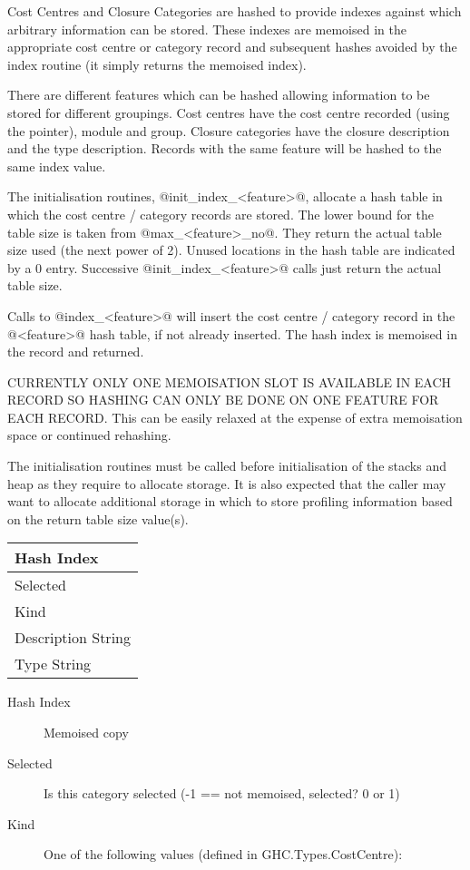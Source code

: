 \documentclass[11pt]{article}
\begin{document}
\begin{itemize}
Cost Centres and Closure Categories are hashed to provide indexes
against which arbitrary information can be stored. These indexes are
memoised in the appropriate cost centre or category record and
subsequent hashes avoided by the index routine (it simply returns the
memoised index).

There are different features which can be hashed allowing information
to be stored for different groupings. Cost centres have the cost
centre recorded (using the pointer), module and group. Closure
categories have the closure description and the type
description. Records with the same feature will be hashed to the same
index value.

The initialisation routines, @init_index_<feature>@, allocate a hash
table in which the cost centre / category records are stored. The
lower bound for the table size is taken from @max_<feature>_no@. They
return the actual table size used (the next power of 2). Unused
locations in the hash table are indicated by a 0 entry. Successive
@init_index_<feature>@ calls just return the actual table size.

Calls to @index_<feature>@ will insert the cost centre / category
record in the @<feature>@ hash table, if not already inserted. The hash
index is memoised in the record and returned. 

CURRENTLY ONLY ONE MEMOISATION SLOT IS AVAILABLE IN EACH RECORD SO
HASHING CAN ONLY BE DONE ON ONE FEATURE FOR EACH RECORD. This can be
easily relaxed at the expense of extra memoisation space or continued
rehashing.

The initialisation routines must be called before initialisation of
the stacks and heap as they require to allocate storage. It is also
expected that the caller may want to allocate additional storage in
which to store profiling information based on the return table size
value(s).

\begin{center}
\begin{tabular}{|l|}
   \hline Hash Index
\\ \hline Selected
\\ \hline Kind
\\ \hline Description String
\\ \hline Type String
\\ \hline
\end{tabular}
\end{center}

\begin{description}
\item[Hash Index] Memoised copy
\item[Selected] 
  Is this category selected (-1 == not memoised, selected? 0 or 1)
\item[Kind]
One of the following values (defined in GHC.Types.CostCentre):


\end{description}
\end{itemize}
\end{document}
